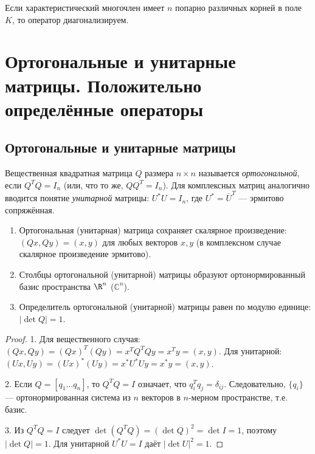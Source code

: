 \documentclass[10pt]{article}
\begin{document}
\begin{corollary}
    Если характеристический многочлен имеет $n$ попарно различных корней в поле $K$, то оператор диагонализируем.
\end{corollary}

\section{Ортогональные и унитарные матрицы. Положительно определённые операторы}

\subsection{Ортогональные и унитарные матрицы}

\begin{definition}
    Вещественная квадратная матрица $Q$ размера $n\times n$ называется \textit{ортогональной}, если $Q^T Q = I_n$ (или, что то же, $Q Q^T = I_n$). Для комплексных матриц аналогично вводится понятие \textit{унитарной} матрицы: $U^* U = I_n$, где $U^* = \overline{U}^T$ — эрмитово сопряжённая.
\end{definition}

\begin{theorem}
    \begin{enumerate}
        \item Ортогональная (унитарная) матрица сохраняет скалярное произведение: $(Qx, Qy) = (x, y)$ для любых векторов $x, y$ (в комплексном случае скалярное произведение эрмитово).
        \item Столбцы ортогональной (унитарной) матрицы образуют ортонормированный базис пространства $\R^n$ ($\mathbb{C}^n$).
        \item Определитель ортогональной (унитарной) матрицы равен по модулю единице: $|\det Q| = 1$.
    \end{enumerate}
\end{theorem}

\begin{proof}
    1. Для вещественного случая: $(Qx, Qy) = (Qx)^T (Qy) = x^T Q^T Q y = x^T y = (x, y)$. Для унитарной: $(Ux, Uy) = (Ux)^* (Uy) = x^* U^* U y = x^* y = (x, y)$.
    
    2. Если $Q = [q_1 \dots q_n]$, то $Q^T Q = I$ означает, что $q_i^T q_j = \delta_{ij}$. Следовательно, $\{q_i\}$ — ортонормированная система из $n$ векторов в $n$-мерном пространстве, т.е. базис.
    
    3. Из $Q^T Q = I$ следует $\det(Q^T Q) = (\det Q)^2 = \det I = 1$, поэтому $|\det Q| = 1$. Для унитарной $U^* U = I$ даёт $|\det U|^2 = 1$.
\end{proof}
\end{document}
